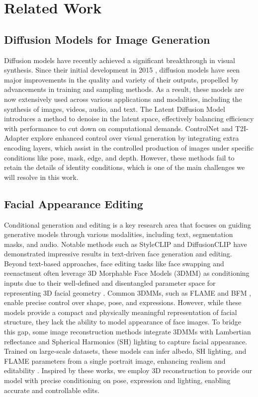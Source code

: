 \section{Related Work}
\subsection{Diffusion Models for Image Generation}
Diffusion models have recently achieved a significant breakthrough in visual synthesis. Since their initial development in 2015 \cite{sohl2015deep}, diffusion models have seen major improvements in the quality and variety of their outputs, propelled by advancements in training and sampling methods. As a result, these models are now extensively used across various applications and modalities, including the synthesis of images, videos, audio, and text. The Latent Diffusion Model \cite{rombach2022high} introduces a method to denoise in the latent space, effectively balancing efficiency with performance to cut down on computational demands. ControlNet \cite{zhang2023adding} and T2I-Adapter \cite{mou2024t2i} explore enhanced control over visual generation by integrating extra encoding layers, which assist in the controlled production of images under specific conditions like pose, mask, edge, and depth. However, these methods fail to retain the details of identity conditions, which is one of the main challenges we will resolve in this work.



\subsection{Facial Appearance Editing}
Conditional generation and editing is a key research area that focuses on guiding generative models through various modalities, including text, segmentation masks, and audio. Notable methods such as StyleCLIP \cite{patashnik2021styleclip} and DiffusionCLIP \cite{kim2022diffusionclip} have demonstrated impressive results in text-driven face generation and editing. Beyond text-based approaches, face editing tasks like face swapping and reenactment \cite{han2024face,ding2023diffusionrig,bounareli2023hyperreenact,zeng2023face} often leverage 3D Morphable Face Models (3DMM) as conditioning inputs due to their well-defined and disentangled parameter space for representing 3D facial geometry \cite{blanz2023morphable}. Common 3DMMs, such as FLAME \cite{li2017learning} and BFM \cite{paysan20093d}, enable precise control over shape, pose, and expressions. However, while these models provide a compact and physically meaningful representation of facial structure, they lack the ability to model appearance of face images. To bridge this gap, some image reconstruction methods integrate 3DMMs with Lambertian reflectance and Spherical Harmonics (SH) lighting to capture facial appearance. Trained on large-scale datasets, these models can infer albedo, SH lighting, and FLAME parameters from a single portrait image, enhancing realism and editability \cite{deng2019accurate,feng2021learning}. Inspired by these works, we employ 3D reconstruction to provide our model with precise conditioning on pose, expression and lighting, enabling accurate and controllable edits.
 


